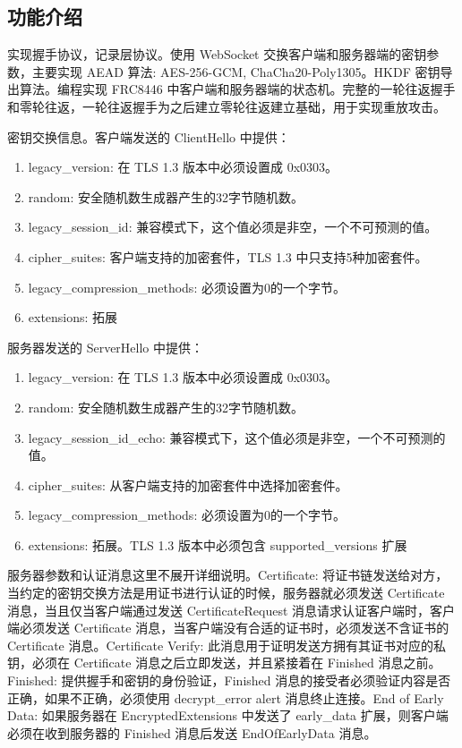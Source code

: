   \subsection{功能介绍}

  实现握手协议，记录层协议。使用 WebSocket 交换客户端和服务器端的密钥参数，主要实现 AEAD 算法: AES-256-GCM, ChaCha20-Poly1305。HKDF\cite{RFC5869} 密钥导出算法。编程实现 FRC8446 中客户端和服务器端的状态机。完整的一轮往返握手和零轮往返，一轮往返握手为之后建立零轮往返建立基础，用于实现重放攻击。

  密钥交换信息。客户端发送的 ClientHello 中提供：

  \begin{enumerate}
    \item legacy\_version: 在 TLS 1.3 版本中必须设置成 0x0303。
    \item random: 安全随机数生成器产生的32字节随机数。
    \item legacy\_session\_id: 兼容模式下，这个值必须是非空，一个不可预测的值。
    \item cipher\_suites: 客户端支持的加密套件，TLS 1.3 中只支持5种加密套件。
    \item legacy\_compression\_methods: 必须设置为0的一个字节。
    \item extensions: 拓展
  \end{enumerate}

  服务器发送的 ServerHello 中提供：

  \begin{enumerate}
    \item legacy\_version: 在 TLS 1.3 版本中必须设置成 0x0303。
    \item random: 安全随机数生成器产生的32字节随机数。
    \item legacy\_session\_id\_echo: 兼容模式下，这个值必须是非空，一个不可预测的值。
    \item cipher\_suites: 从客户端支持的加密套件中选择加密套件。
    \item legacy\_compression\_methods: 必须设置为0的一个字节。
    \item extensions: 拓展。TLS 1.3 版本中必须包含 supported\_versions 扩展
  \end{enumerate}

  服务器参数和认证消息这里不展开详细说明。Certificate: 将证书链发送给对方，当约定的密钥交换方法是用证书进行认证的时候，服务器就必须发送 Certificate 消息，当且仅当客户端通过发送 CertificateRequest 消息请求认证客户端时，客户端必须发送 Certificate 消息，当客户端没有合适的证书时，必须发送不含证书的 Certificate 消息。Certificate Verify: 此消息用于证明发送方拥有其证书对应的私钥，必须在 Certificate 消息之后立即发送，并且紧接着在 Finished 消息之前。Finished: 提供握手和密钥的身份验证，Finished 消息的接受者必须验证内容是否正确，如果不正确，必须使用 decrypt\_error alert 消息终止连接。End of Early Data: 如果服务器在 EncryptedExtensions 中发送了 early\_data 扩展，则客户端必须在收到服务器的 Finished 消息后发送 EndOfEarlyData 消息。


